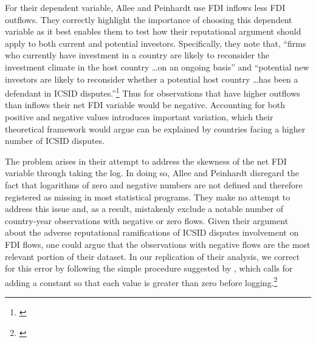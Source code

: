 \documentclass[12pt,onesided]{amsart}
\begin{document}
For their dependent variable, Allee and Peinhardt use FDI inflows less FDI outflows. They correctly highlight the importance of choosing this dependent variable as it best enables them to test how their reputational argument should apply to both current and potential investors. Specifically, they note that, ``firms who currently have investment in a country are likely to reconsider the investment climate in the host country \ldots on an ongoing basis'' and ``potential new investors are likely to reconsider whether a potential host country \ldots has been a defendant in ICSID disputes.''\footnote{\citet[p. 419--420]{allee:peinhardt:2011}} Thus for observations that have higher outflows than inflows their net FDI variable would be negative. Accounting for both positive and negative values introduces important variation, which their theoretical framework would argue can be explained by countries facing a higher number of ICSID disputes. 

The problem arises in their attempt to address the skewness of the net FDI variable through taking the log. In doing so, Allee and Peinhardt disregard the fact that logarithms of zero and negative numbers are not defined and therefore registered as missing in most statistical programs. They make no attempt to address this issue and, as a result, mistakenly exclude a notable number of country-year observations with negative or zero flows. Given their argument about the adverse reputational ramifications of ICSID disputes involvement on FDI flows, one could argue that the observations with negative flows are the most relevant portion of their dataset. In our replication of their analysis, we correct for this error by following the simple procedure suggested by \citeauthor{li:2009}, which calls for adding a constant so that each value is greater than zero before logging.\footnote{\citet{li:2009}} 
\end{document}
